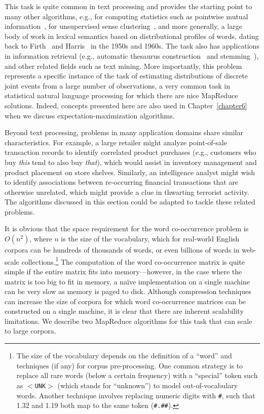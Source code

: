 \documentclass[11pt]{article}
\begin{document}
This task is quite common in text processing and provides the starting
point to many other algorithms, e.g., for computing statistics such as
pointwise mutual information~\cite{Church_Hanks_1990}, for
unsupervised sense clustering~\cite{Schutze_CL1998}, and more
generally, a large body of work in lexical semantics based on
distributional profiles of words, dating back to
Firth~\cite{Firth_1957} and Harris~\cite{Harris_1968} in the 1950s and
1960s.  The task also has applications in information retrieval (e.g.,
automatic thesaurus construction~\cite{Schutze_Pedersen_IPM1997} and
stemming~\cite{Xu_Croft_TOIS1998}), and other related fields such as
text mining.  More importantly, this problem represents a specific
instance of the task of estimating distributions of discrete joint
events from a large number of observations, a very common task in
statistical natural language processing for which there are nice
MapReduce solutions.  Indeed, concepts presented here are also used in
Chapter~\ref{chapter6} when we discuss expectation-maximization
algorithms.

Beyond text processing, problems in many application domains share
similar characteristics.  For example, a large retailer might analyze
point-of-sale transaction records to identify correlated product
purchases (e.g., customers who buy \emph{this} tend to also buy \emph{
  that}), which would assist in inventory management and product
placement on store shelves.  Similarly, an intelligence analyst might
wish to identify associations between re-occurring financial
transactions that are otherwise unrelated, which might provide a clue
in thwarting terrorist activity.  The algorithms discussed in this
section could be adapted to tackle these related problems.

It is obvious that the space requirement for the word co-occurrence
problem is $O(n^2)$, where $n$ is the size of the vocabulary, which
for real-world English corpora can be hundreds of thousands of words,
or even billions of words in web-scale collections.\footnote{The size
  of the vocabulary depends on the definition of a ``word'' and
  techniques (if any) for corpus pre-processing.  One common strategy
  is to replace all rare words (below a certain frequency) with a
  ``special'' token such as \texttt{$<$UNK$>$} (which stands for
  ``unknown'') to model out-of-vocabulary words.  Another technique
  involves replacing numeric digits with \texttt{\#}, such that 1.32 and
  1.19 both map to the same token (\texttt{\#.\#\#}).}  The computation
of the word co-occurrence matrix is quite simple if the entire matrix
fits into memory---however, in the case where the matrix is too big to
fit in memory, a na\"{i}ve implementation on a single machine can be
very slow as memory is paged to disk.  Although compression techniques
can increase the size of corpora for which word co-occurrence matrices
can be constructed on a single machine, it is clear that there are
inherent scalability limitations.  We describe two MapReduce
algorithms for this task that can scale to large corpora.
\end{document}

